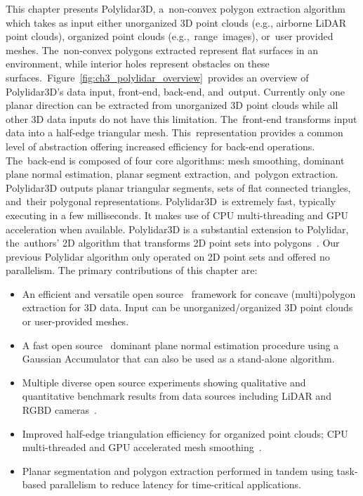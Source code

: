 This chapter presents Polylidar3D, a~non-convex polygon extraction algorithm which takes as input either unorganized 3D point clouds (e.g., airborne LiDAR point clouds), organized point clouds (e.g.,~range~images), or~user provided meshes. The~non-convex polygons extracted represent flat surfaces in an environment, while interior holes represent obstacles on these surfaces.~Figure~\ref{fig:ch3_polylidar_overview}~provides an overview of Polylidar3D's data input, front-end, back-end, and~output.  Currently only one planar direction can be extracted from unorganized 3D point clouds while all other 3D data inputs do not have this limitation. The~front-end transforms input data into a half-edge triangular mesh.  This~representation provides a common level of abstraction offering increased efficiency for back-end operations. The~back-end is composed of four core algorithms: mesh smoothing, dominant plane normal estimation, planar segment extraction, and~polygon extraction.  Polylidar3D outputs planar triangular segments, sets of flat connected triangles, and~their polygonal representations. Polylidar3D~is extremely fast, typically executing in a few milliseconds. It makes use of CPU multi-threading and GPU acceleration when available. Polylidar3D is a substantial extension to Polylidar, the~authors' 2D algorithm that transforms 2D point sets into polygons~\cite{castagno_polylidar_2020}. Our previous Polylidar algorithm only operated on 2D point sets and offered no parallelism. 
The primary contributions of this chapter are:

\begin{itemize}
  \item An efficient and versatile open source~\cite{Castagno_Github_Polylidar} framework for concave (multi)polygon extraction for 3D data. Input can be unorganized/organized 3D point clouds or user-provided meshes.
  \item A fast open source~\cite{Castagno_Github_fastga} dominant plane normal estimation procedure using a Gaussian Accumulator that can also be used as a stand-alone algorithm.
  \item Multiple diverse open source experiments showing qualitative and quantitative benchmark results from data sources including LiDAR and \ac{RGBD} cameras~\cite{Castagno_Github_Polylidar3D_Kitti, Castagno_Github_Polylidar3D_RealSense, Castagno_Github_Polylidar_Synpeb}.
  \item Improved half-edge triangulation efficiency for organized point clouds; CPU multi-threaded and GPU accelerated mesh smoothing~\cite{Castagno_Github_opf}. 
  \item Planar segmentation and polygon extraction performed in tandem using task-based parallelism to reduce latency for time-critical applications. 
\end{itemize}

